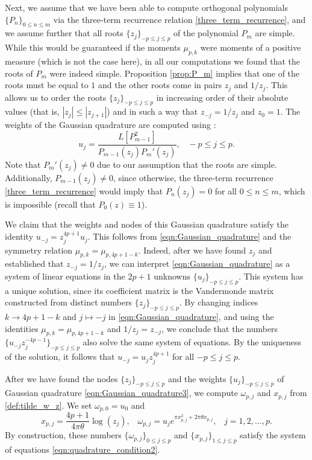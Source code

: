 \documentclass[12pt]{article}
\theoremstyle{definition}
\begin{document}
Next, we assume that we have been able to compute orthogonal polynomials 
$\{P_n\}_{0\le n \le m}$ via the three-term recurrence relation 
\eqref{three_term_recurrence}, and we assume further that all roots $\{z_j\}_{-p \le j \le p}$ of the polynomial $P_m$ are simple. While this would be guaranteed if the moments $\mu_{p,k}$ were moments of a positive measure (which is not the case here), in all our computations we found that the roots of $P_m$ were indeed simple. Proposition \ref{prop:P_m} implies that one of the roots must be equal to $1$ and the other roots come in pairs $z_j$ and $1/z_j$. This allows us to order the roots $\{z_j\}_{-p \le j \le p}$ in increasing order of their absolute values (that is, $|z_j|\le |z_{j+1}|$) and in such a way that $z_{-j}=1/z_j$ and $z_0=1$. 
The weights of the Gaussian quadrature are computed using \cite[formula (3)]{Laurie_2001}:
 \begin{equation}
 u_j= \frac{L[P_{m-1}^2]}{ P_{m-1}(z_j) P_{m}'(z_j)}, \;\;\; -p \le j \le p.
 \end{equation}
Note that $P_{m}'(z_j)\neq 0$ due to our assumption that the roots are simple. Additionally, $P_{m-1}(z_j)\neq 0$, since otherwise, the three-term recurrence \eqref{three_term_recurrence} would imply that $P_n(z_j)=0$ for all $0\le n \le m$, which is impossible (recall that $P_0(z)\equiv 1$). 

We claim that the weights and nodes of this Gaussian quadrature  satisfy the identity $u_{-j}=z_j^{4p+1} u_j$. This follows from \eqref{eqn:Gaussian_quadrature} and the symmetry relation $\mu_{p,k}=\mu_{p,4p+1-k}$. Indeed, after we have found $z_j$ and established that $z_{-j}=1/z_j$, we can interpret \eqref{eqn:Gaussian_quadrature} as a system of linear equations in the $2p+1$ unknowns $\{u_j\}_{-p \le j \le p}$. This system has a unique solution, since its coefficient matrix is the Vandermonde matrix constructed from distinct numbers $\{z_j\}_{-p \le j \le p}$. By changing indices $k \to 4p+1-k$ and $j \mapsto -j$ in \eqref{eqn:Gaussian_quadrature}, and using the identities $\mu_{p,k}=\mu_{p,4p+1-k}$ and $1/z_{j}=z_{-j}$, we conclude that the numbers  
$\{u_{-j}z_j^{-4p-1}\}_{-p \le j \le p}$ also solve the same system of equations. By the uniqueness of the solution, it follows that $u_{-j}=u_j z_{j}^{4p+1}$ for all $-p \le j \le p$.

After we have found the nodes  $\{z_j\}_{-p\le j \le p}$ and the weights $\{u_j\}_{-p\le j \le p}$ of Gaussian quadrature \eqref{eqn:Gaussian_quadrature3}, we compute $\omega_{p,j}$ and $x_{p,j}$ from \eqref{def:tilde_w_z}. We set $\omega_{p,0}=u_0$ and
\begin{equation}\label{def:tilde_w_z}
x_{p,j}=\frac{4p+1}{4\pi \theta} \log(z_j), \;\;\;
\omega_{p,j}=u_j e^{\pi x_{p,j}^2 + 2\pi \theta x_{p,j}}, \;\;\;
 j=1,2,\dots,p.
\end{equation}
By construction, these numbers $\{\omega_{p,j}\}_{0 \le j \le p}$ and 
$\{x_{p,j}\}_{1 \le j \le p}$ satisfy the system of equations \eqref{eqn:quadrature_condition2}. 
\end{document}
